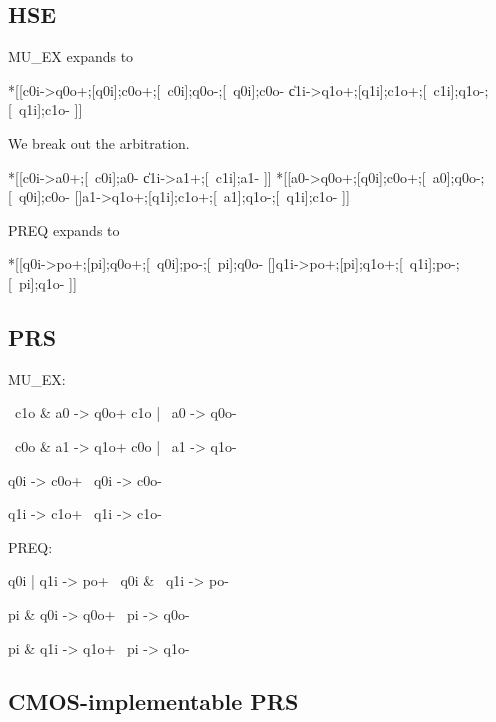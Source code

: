 \documentclass[aer.tex]{subfiles}
\begin{document}
\subsection{HSE}

MU\_EX expands to
\begin{hse}
*[[c0i->q0o+;[q0i];c0o+;[~c0i];q0o-;[~q0i];c0o-
  \|c1i->q1o+;[q1i];c1o+;[~c1i];q1o-;[~q1i];c1o-
 ]]
\end{hse}

We break out the arbitration.

\begin{hse}
*[[c0i->a0+;[~c0i];a0-
  \|c1i->a1+;[~c1i];a1-
 ]]
*[[a0->q0o+;[q0i];c0o+;[~a0];q0o-;[~q0i];c0o-
  []a1->q1o+;[q1i];c1o+;[~a1];q1o-;[~q1i];c1o-
 ]]
\end{hse}

PREQ expands to

\begin{hse}
*[[q0i->po+;[pi];q0o+;[~q0i];po-;[~pi];q0o-
  []q1i->po+;[pi];q1o+;[~q1i];po-;[~pi];q1o-
 ]]
\end{hse}

\subsection{PRS}

MU\_EX:

\begin{prs2}
~c1o & a0 -> q0o+
c1o | ~a0 -> q0o-

~c0o & a1 -> q1o+
c0o | ~a1 -> q1o-
\end{prs2}

\begin{prs2}
q0i -> c0o+
~q0i -> c0o-

q1i -> c1o+
~q1i -> c1o-
\end{prs2}

PREQ:

\begin{prs2}
q0i | q1i -> po+
~q0i & ~q1i -> po-
\end{prs2}

\begin{prs2}
pi & q0i -> q0o+
~pi -> q0o-

pi & q1i -> q1o+
~pi -> q1o-
\end{prs2}

\subsection{CMOS-implementable PRS}
\end{document}
